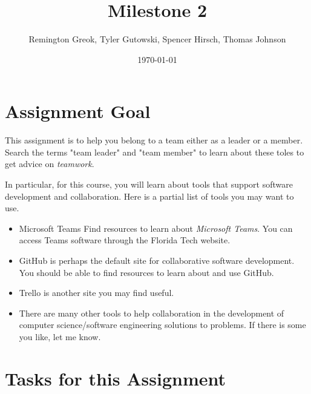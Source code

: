 \documentclass{article}
\begin{document}
\title{\textbf{Milestone 2}}
\author{Remington Greok, Tyler Gutowski, Spencer Hirsch, Thomas Johnson}
\date{\today}

\maketitle

\section{\textbf{Assignment Goal}}
\noindent This assignment is to help you belong to a team either as a leader or a
member. Search the terms "team leader" and "team member" to learn about these 
toles to get advice on \textit{teamwork}.

In particular, for this course, you will learn about tools that support software
development and collaboration. Here is a partial list of tools you may want to use.

\begin{itemize}
    \item Microsoft Teams Find resources to learn about \textit{Microsoft Teams}.
    You can access Teams software through the Florida Tech website.
    \item GitHub is perhaps the default site for collaborative software development.
    You should be able to find resources to learn about and use GitHub.
    \item Trello is another site you may find useful.
    \item There are many other tools to help collaboration in the development of 
    computer science/software engineering solutions to problems. If there is some
    you like, let me know.
\end{itemize}

\section{\textbf{Tasks for this Assignment}}
\end{document}
